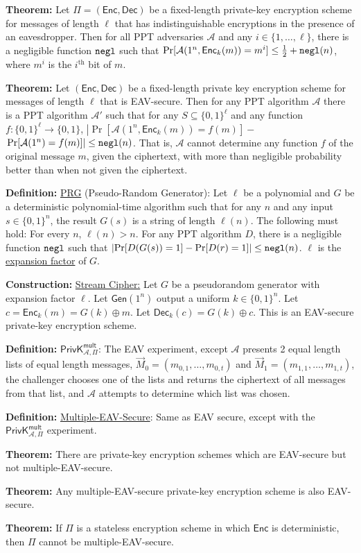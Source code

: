 \documentclass[10pt]{article}
\newcommand{\AAA}{\mathcal{A}}
\newcommand{\defn}[1]{{\bf Definition:} \underline{#1}}
\newcommand{\thm}[1]{{\bf Theorem:} \underline{#1}}
\newcommand{\con}[1]{{\bf Construction:} \underline{#1}}
\newcommand{\Enc}{\mathsf{Enc}}
\newcommand{\Dec}{\mathsf{Dec}}
\newcommand{\Gen}{\mathsf{Gen}}
\newcommand{\ExptMultArgs}[2]{\mathsf{PrivK}^{\mathsf{mult}}_{#1,#2}}
\newcommand{\ExptMult}{\ExptMultArgs{\AAA}{\Pi}}
\newcommand{\xor}{\oplus}
\newcommand{\negl}{{\tt negl}}
\begin{document}
\begin{multicols}{3}
\thm{}Let $\Pi=(\Enc,\Dec)$ be a fixed-length private-key encryption scheme for messages of length $\ell$ that has indistinguishable encryptions in the presence of an eavesdropper. Then for all PPT adversaries $\AAA$ and any $i\in\{1,\dots,\ell\}$, there is a negligible function $\negl$ such that $\Pr[\AAA(1^n,\Enc_k(m))=m^i]\leq\frac{1}{2}+\negl(n)$, where $m^i$ is the $i^{\text{th}}$ bit of $m$.

\thm{}Let $(\Enc,\Dec)$ be a fixed-length private key encryption scheme for messages of length $\ell$ that is EAV-secure. Then for any PPT algorithm $\AAA$ there is a PPT algorithm $\AAA'$ such that for any $S\subseteq\{0,1\}^\ell$ and any function $f:\{0,1\}^\ell\to\{0,1\}$, $\left|\Pr[\AAA(1^n,\Enc_k(m))=f(m)]-\right.$ $\left.\Pr[\AAA(1^n)=f(m)]\right|\leq\negl(n)$. That is, $\AAA$ cannot determine any function $f$ of the original message $m$, given the ciphertext, with more than negligible probability better than when not given the ciphertext.

\defn{PRG} (Pseudo-Random Generator): Let $\ell$ be a polynomial and $G$ be a deterministic polynomial-time algorithm such that for any $n$ and any input $s\in\{0,1\}^n$, the result $G(s)$ is a string of length $\ell(n)$. The following must hold: For every $n$, $\ell(n)>n$. For any PPT algorithm $D$, there is a negligible function $\negl$ such that $\left|\Pr[D(G(s))=1]-\Pr[D(r)=1]\right|\leq\negl(n)$. $\ell$ is the \underline{expansion factor} of $G$.

\con{Stream Cipher:} Let $G$ be a pseudorandom generator with expansion factor $\ell$. Let $\Gen(1^n)$ output a uniform $k\in\{0,1\}^n$. Let $c=\Enc_k(m)=G(k)\xor m$. Let $\Dec_k(c)=G(k)\xor c$. This is an EAV-secure private-key encryption scheme.

\defn{$\ExptMult$}: The EAV experiment, except $\AAA$ presents 2 equal length lists of equal length messages, $\vec{M}_0=(m_{0,1},\dots,m_{0,t})$ and $\vec{M}_1=(m_{1,1},\dots,m_{1,t})$, the challenger chooses one of the lists and returns the ciphertext of all messages from that list, and $\AAA$ attempts to determine which list was chosen.

\defn{Multiple-EAV-Secure}: Same as EAV secure, except with the $\ExptMult$ experiment.

\thm{}There are private-key encryption schemes which are EAV-secure but not multiple-EAV-secure.

\thm{}Any multiple-EAV-secure private-key encryption scheme is also EAV-secure.

\thm{}If $\Pi$ is a stateless encryption scheme in which $\Enc$ is deterministic, then $\Pi$ cannot be multiple-EAV-secure.


\end{multicols}
\end{document}
